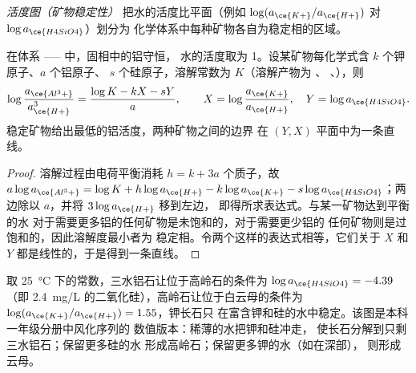 \begin{definition}[活度图]\label{def:b3:water-rock-interaction:activity-diagram}
\emph{活度图（矿物稳定性）}
把水的活度比平面（例如
$\log(a_{\ce{K+}}/a_{\ce{H+}})$ 对 $\log a_{\ce{H4SiO4}}$）划分为
化学体系中每种矿物各自为稳定相的区域。
\end{definition}

\begin{proposition}[活度图的边界]\label{prop:b3:water-rock-interaction:boundaries}
在体系 ------ 中，固相中的铝守恒，
水的活度取为 1。设某矿物每化学式含 $k$ 个钾原子、$a$ 个铝原子、
$s$ 个硅原子，溶解常数为 $K$（溶解产物为 、
、），则
\[
\log\frac{a_{\ce{Al^3+}}}{a_{\ce{H+}}^3} = \frac{\log K - kX - sY}{a},
\qquad X = \log\frac{a_{\ce{K+}}}{a_{\ce{H+}}},\quad Y = \log a_{\ce{H4SiO4}}.
\]
稳定矿物给出最低的铝活度，两种矿物之间的边界
在 $(Y, X)$ 平面中为一条直线。
\end{proposition}

\begin{proof}
溶解过程由电荷平衡消耗 $h = k + 3a$ 个质子，故 $a\log
a_{\ce{Al^3+}} = \log K + h\log a_{\ce{H+}} - k\log a_{\ce{K+}} - s\log
a_{\ce{H4SiO4}}$；两边除以 $a$，并将 $3\log a_{\ce{H+}}$ 移到左边，
即得所求表达式。与某一矿物达到平衡的水
对于需要更多铝的任何矿物是未饱和的，对于需要更少铝的
任何矿物则是过饱和的，因此溶解度最小者为
稳定相。令两个这样的表达式相等，它们关于 $X$ 和 $Y$ 都是线性的，于是得到一条直线。
\end{proof}

取 \qty{25}{\celsius} 下的常数，三水铝石让位于高岭石的条件为
$\log a_{\ce{H4SiO4}} = -4.39$（即 \qty{2.4}{mg/L} 的二氧化硅），高岭石让位于白云母的条件为
$\log(a_{\ce{K+}}/a_{\ce{H+}}) = 1.55$，钾长石只
在富含钾和硅的水中稳定。该图是本科一年级分册中风化序列的
数值版本：稀薄的水把钾和硅冲走，
使长石分解到只剩三水铝石；保留更多硅的水
形成高岭石；保留更多钾的水（如在深部），
则形成云母。

